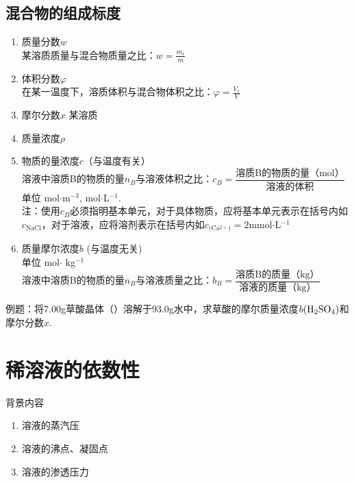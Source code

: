\documentclass[12pt, a4paper, oneside]{ctexbook}
\begin{document}
\section*{混合物的组成标度}
\begin{enumerate}
    \item 质量分数$w$ \\某溶质质量与混合物质量之比：$w = \frac{m_s}{m}$
    \item 体积分数$\varphi$\\在某一温度下，溶质体积与混合物体积之比：$\varphi = \frac{V_s}{V}$
    \item 摩尔分数$x$ 某溶质
    \item 质量浓度$\rho $
    \item 物质的量浓度$c$（与温度有关）\\溶液中溶质B的物质的量$n_B$与溶液体积之比：$c_B = \dfrac{\text{溶质B的物质的量（mol）}}{\text{溶液的体积}}$\\
            单位 mol$\cdot$m$^{-3}$, mol$\cdot$L$^{-1}$.\\
            注：使用$c_B$必须指明基本单元，对于具体物质，应将基本单元表示在括号内如$c_{\text{NaCl}}$，对于溶液，应将溶剂表示在括号内如$c_{\text{(Ca$^{2+}$)}} = 2$mmol$\cdot$L$^{-1}$
    \item 质量摩尔浓度$b$ (与温度无关)\\单位 mol$\cdot$ kg$^{-1}$\\
            溶液中溶质B的物质的量$n_B$与溶液质量之比：$b_B = \dfrac{\text{溶质B的质量（kg）}}{\text{溶液的质量（kg）}}$\\
\end{enumerate}
例题：将7.00g草酸晶体（）溶解于93.0g水中，求草酸的摩尔质量浓度$b(\ce{H2SO4})$和摩尔分数$x$.\\

\chapter{稀溶液的依数性}
背景内容
\begin{enumerate}
    \item 溶液的蒸汽压
    \item 溶液的沸点、凝固点
    \item 溶液的渗透压力
\end{enumerate}
\newpage
\end{document}
